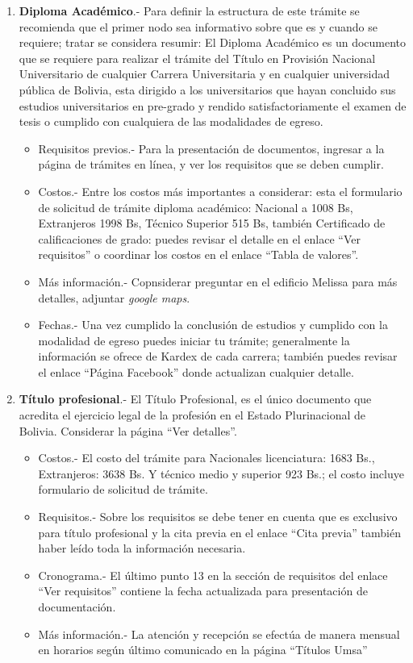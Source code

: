 \documentclass[letter, openright, 12pt]{book}
\begin{document}
\begin{enumerate}[label=(\alph*)]
\item \textbf{Diploma Académico}.- Para definir la estructura de este trámite se recomienda que el primer nodo sea informativo sobre que es y cuando se requiere; tratar se considera resumir: El Diploma Académico es un documento que se requiere para realizar el trámite del Título en Provisión Nacional Universitario de cualquier Carrera Universitaria y en cualquier universidad pública de Bolivia, esta dirigido a los universitarios que hayan concluido sus estudios universitarios en pre-grado y rendido satisfactoriamente el examen de tesis o cumplido con cualquiera de las modalidades de egreso.
\begin{itemize}
\item Requisitos previos.- Para la presentación de documentos, ingresar a la página de trámites en línea, y ver los requisitos que se deben cumplir. 
\item Costos.- Entre los costos más importantes a considerar: esta el formulario de solicitud de trámite diploma académico: Nacional a 1008 Bs, Extranjeros 1998 Bs, Técnico Superior 515 Bs, también Certificado de calificaciones de grado: puedes revisar el detalle en el enlace “Ver requisitos” o coordinar los costos en el enlace “Tabla de valores”.
\item Más información.- Copnsiderar preguntar en el edificio Melissa para más detalles, adjuntar \textit{google maps}.
\item Fechas.- Una vez cumplido la conclusión de estudios y cumplido con la modalidad de egreso puedes iniciar tu trámite; generalmente la información se ofrece de Kardex de cada carrera; también puedes revisar el enlace “Página Facebook” donde actualizan cualquier detalle.
\end{itemize}

\item \textbf{Título profesional}.- El Título Profesional, es el único documento que acredita el ejercicio legal de la profesión en el Estado Plurinacional de Bolivia. Considerar la página “Ver detalles”.
\begin{itemize}
\item Costos.- El costo del trámite para Nacionales licenciatura: 1683 Bs., Extranjeros: 3638 Bs. Y técnico medio y superior 923 Bs.; el costo incluye formulario de solicitud de trámite.
\item Requisitos.- Sobre los requisitos se debe tener en cuenta que es exclusivo para título profesional y la cita previa en el enlace “Cita previa” también haber leído toda la información necesaria.
\item Cronograma.- El último punto 13 en la sección de requisitos del enlace  “Ver requisitos” contiene la fecha actualizada para presentación de documentación.
\item Más información.- La atención y recepción se efectúa de manera mensual en horarios según último comunicado en la página “Títulos Umsa” 
\end{itemize}


\end{enumerate}
\end{document}
